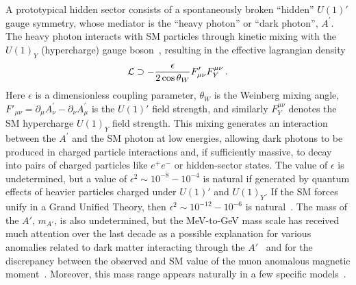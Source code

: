 \documentclass[twocolumn, showpacs, preprintnumbers,prd, superscriptaddress]{revtex4-1}
\newcommand{\pos}{e^{+}}
\newcommand{\ele}{e^{-}}
\newcommand{\epem}{\pos\ele}
\newcommand{\aprime}{A^\prime}
\begin{document}
        A prototypical hidden sector consists of a spontaneously broken 
        ``hidden'' $U(1)'$ gauge symmetry, whose mediator is the 
        ``heavy photon'' or ``dark photon'', $\aprime$.  The heavy photon
        interacts with SM particles through kinetic mixing with the $U(1)_Y$ 
        (hypercharge) gauge boson~\cite{Holdom:1985ag,Galison:1983pa}, 
        resulting in the effective lagrangian density
        \begin{equation} \label{kmix} 
            {\cal L} \supset -\frac{\epsilon}{2\cos\theta_W} F'_{\mu\nu} F^{\mu\nu}_Y\,. 
        \end{equation}
        Here $\epsilon$ is a dimensionless coupling parameter, $\theta_W$ is the 
        Weinberg mixing angle, 
        $F'_{\mu\nu}=\partial_{\mu}\aprime_{\nu}-\partial_{\nu}\aprime_{\mu}$ 
        is the $U(1)'$ field strength, and similarly $F^{\mu\nu}_Y$ denotes the
        SM hypercharge $U(1)_Y$ field strength. This mixing generates an 
        interaction between the $\aprime$ and the SM photon at low energies,  
        allowing dark photons to be produced in charged particle interactions
        and, if sufficiently massive, to decay into pairs of charged particles 
        like $\epem$ or hidden-sector states.  The value of $\epsilon$ is 
        undetermined, but a value of $\epsilon^2 \sim 10^{-8}-10^{-4}$ is 
        natural if generated by quantum effects of heavier particles charged
        under $U(1)'$ and $U(1)_Y$.  If the SM forces unify in a Grand Unified 
        Theory, then $\epsilon^2 \sim 10^{-12}-10^{-6}$ is 
        natural~\cite{ArkaniHamed:2008qp,Baumgart:2009tn,Essig:2009nc}.  
        The mass of the $A'$, $m_{A'}$, is also undetermined, but the MeV-to-GeV
        mass scale has received much attention over the last decade as a 
        possible explanation for various anomalies related to dark matter
        interacting through the $A'$~\cite{ArkaniHamed:2008qn,Pospelov:2008jd,
        Finkbeiner:2007kk,Fayet:2004bw,Kaplinghat:2015aga} and for the 
        discrepancy between the observed and SM value of the muon anomalous 
        magnetic moment~\cite{Pospelov:2008zw,Bennett:2006fi,Davier:2010nc}.  
        Moreover, this mass range appears naturally in a few specific
        models~\cite{ArkaniHamed:2008qp,Cheung:2009fk,Baumgart:2009tn,
        Morrissey:2009ur,Essig:2009nc}. 
\end{document}
